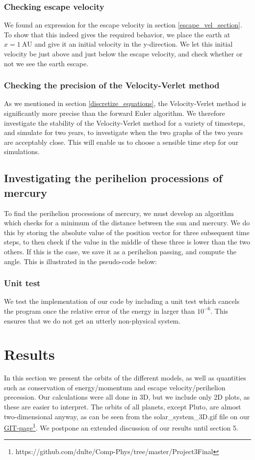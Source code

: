 \documentclass[a4paper, 10pt]{article}
\begin{document}
\subsubsection{Checking escape velocity}
We found an expression for the escape velocity in section \ref{escape_vel_section}. To show that this indeed gives the required behavior, we place the earth at $x=1\ \mathrm{AU}$ and give it an initial velocity in the y-direction. We let this initial velocity be just above and just below the escape velocity, and check whether or not we see the earth escape.
\subsubsection{Checking the precision of the Velocity-Verlet method}
As we mentioned in section \ref{discretize_equations}, the Velocity-Verlet method is significantly more precise than the forward Euler algorithm. We therefore investigate the stability of the Velocity-Verlet method for a variety of timesteps, and simulate for two years, to investigate when the two graphs of the two years are acceptably close. This will enable us to choose a sensible time step for our simulations.
\subsection{Investigating the perihelion processions of mercury}
To find the perihelion processions of mercury, we must develop an algorithm which checks for a minimum of the distance between the sun and mercury. We do this by storing the absolute value of the position vector for three subsequent time steps, to then check if the value in the middle of these three is lower than the two others. If this is the case, we save it as a perihelion passing, and compute the angle. This is illustrated in the pseudo-code below:

\subsubsection{Unit test}
We test the implementation of our code by including a unit test which cancels the program once the relative error of the energy in larger than $10^{-6}$. This ensures that we do not get an utterly non-physical system.
\newpage

\section{Results}
In this section we present the orbits of the different models, as well as quantities such as conservation of energy/momentum and escape velocity/perihelion precession. Our calculations were all done in 3D, but we include only 2D plots, as these are easier to interpret. The orbits of all planets, except Pluto, are almost two-dimensional anyway, as can be seen from the solar\_system\_3D.gif file on our \href{https://github.com/dulte/Comp-Phys/tree/master/Project3Final}{GIT-page}\footnote{https://github.com/dulte/Comp-Phys/tree/master/Project3Final}. We postpone an extended discussion of our results until section 5.
\end{document}

